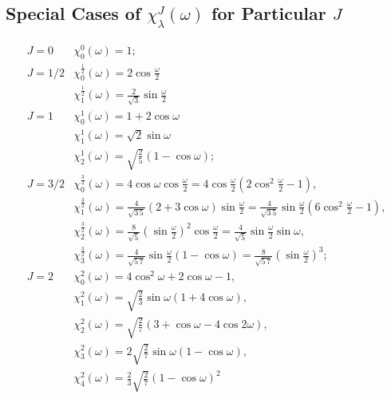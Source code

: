 \subsection{Special Cases of $\chi_{\lambda}^{J}(\omega)$ for Particular $J$}\label{sec:4.15.9}
\begin{equation}
\begin{array}{ll}
J=0 & \chi_{0}^{0}(\omega)=1 ; \\
J=1 / 2 & \chi_{0}^{\frac{1}{2}}(\omega)=2 \cos \frac{\omega}{2} \\
& \chi_{1}^{\frac{1}{2}}(\omega)=\frac{2}{\sqrt{3}} \sin \frac{\omega}{2} \\
J=1 & \chi_{0}^{1}(\omega)=1+2 \cos \omega \\
& \chi_{1}^{1}(\omega)=\sqrt{2} \sin \omega \\
& \chi_{2}^{1}(\omega)=\sqrt{\frac{2}{5}}(1-\cos \omega) ; \\
J=3 / 2 & \chi_{0}^{\frac{3}{2}}(\omega)=4 \cos \omega \cos \frac{\omega}{2}=4 \cos \frac{\omega}{2}\left(2 \cos ^{2} \frac{\omega}{2}-1\right), \\
& \chi_{1}^{\frac{3}{2}}(\omega)=\frac{4}{\sqrt{3 \, 5}}(2+3 \cos \omega) \sin \frac{\omega}{2}=\frac{4}{\sqrt{3 \, 5}} \sin \frac{\omega}{2}\left(6 \cos ^{2} \frac{\omega}{2}-1\right), \\
& \chi_{2}^{\frac{3}{2}}(\omega)=\frac{8}{\sqrt{5}}\left(\sin \frac{\omega}{2}\right)^{2} \cos \frac{\omega}{2}=\frac{4}{\sqrt{5}} \sin \frac{\omega}{2} \sin \omega,  \label{eq:4:15:53}\\
& \chi_{3}^{\frac{3}{2}}(\omega)=\frac{4}{\sqrt{5 \, 7}} \sin \frac{\omega}{2}(1-\cos \omega)=\frac{8}{\sqrt{5 \, 7}}\left(\sin \frac{\omega}{2}\right)^{3} ; \\
J=2 & \chi_{0}^{2}(\omega)=4 \cos ^{2} \omega+2 \cos \omega-1, \\
& \chi_{1}^{2}(\omega)=\sqrt{\frac{2}{3}} \sin \omega(1+4 \cos \omega), \\
& \chi_{2}^{2}(\omega)=\sqrt{\frac{2}{7}}(3+\cos \omega-4 \cos 2 \omega), \\
& \chi_{3}^{2}(\omega)=2 \sqrt{\frac{2}{7}} \sin \omega(1-\cos \omega), \\
& \chi_{4}^{2}(\omega)=\frac{2}{3} \sqrt{\frac{2}{7}}(1-\cos \omega)^{2}
\end{array}
\end{equation}
